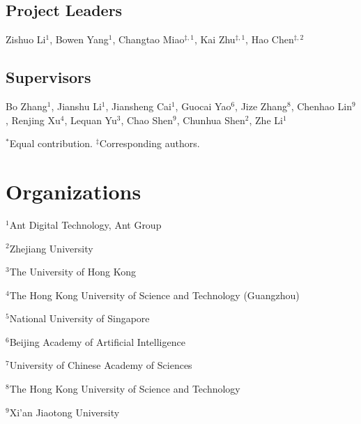 \documentclass[11pt, a4paper, logo, copyright, nonumbering]{antgroup}
\begin{document}
\subsection*{Project Leaders}
Zishuo Li$^{1}$, Bowen Yang$^{1}$, Changtao Miao$^{\ddag,1}$, Kai Zhu$^{\ddag,1}$, Hao Chen$^{\ddag,2}$

\subsection*{Supervisors}
Bo Zhang$^{1}$, Jianshu Li$^{1}$, Jiansheng Cai$^{1}$, Guocai Yao$^{6}$, Jize Zhang$^{8}$, Chenhao Lin$^{9}$, Renjing Xu$^{4}$, Lequan Yu$^{3}$, Chao Shen$^{9}$, Chunhua Shen$^{2}$, Zhe Li$^{1}$

\vspace{3mm}
\noindent $^{*}$Equal contribution. $^{\ddag}$Corresponding authors.

\section*{Organizations}
\noindent $^{1}$Ant Digital Technology, Ant Group

\noindent $^{2}$Zhejiang University

\noindent $^{3}$The University of Hong Kong

\noindent $^{4}$The Hong Kong University of Science and Technology (Guangzhou)

\noindent $^{5}$National University of Singapore

\noindent $^{6}$Beijing Academy of Artificial Intelligence

\noindent $^{7}$University of Chinese Academy of Sciences

\noindent $^{8}$The Hong Kong University of Science and Technology

\noindent $^{9}$Xi'an Jiaotong University


\clearpage



\newpage

\end{document}
